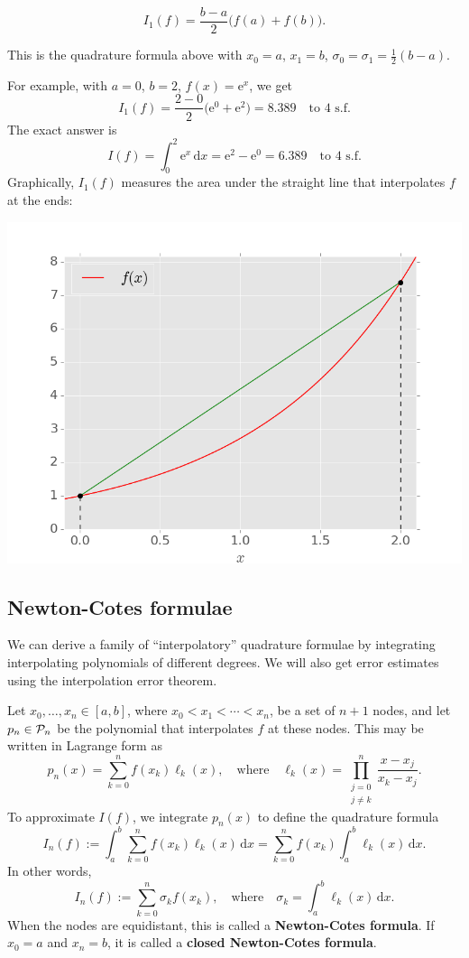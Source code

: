 \documentclass[
  letterpaper,
  DIV=11,
  numbers=noendperiod]{scrreprt}
\newenvironment{fbxSimple}[3]{\begin{tcolorbox}[enhanced, breakable,%
attach boxed title to top*={xshift=1.4pt},
boxed title style={boxrule=0.0mm, fuzzy shadow={1pt}{-1pt}{0mm}{0.1mm}{gray}, arc=.3em, rounded corners=east, sharp corners=west}, colframe=#1-color2, colbacktitle=#1-color1, colback = white, coltitle=black,  titlerule=0mm, toprule=0pt, bottomrule=.7pt, leftrule=.3em, rightrule=.7pt, outer arc=.3em,  	left=.5em, right=.5em, bottomtitle=1mm, toptitle=1mm,title=\textbf{#2}\hspace{0.5em}{#3}]}
{\end{tcolorbox}}
\begin{document}
\label{the-trapezium-rule}
\begin{fbxSimple}{eg}{Example 4.7: }{The trapezium rule}
\label{the-trapezium-rule}
\[
I_1(f) = \frac{b-a}{2}\Big( f(a) + f(b) \Big).
\]

This is the quadrature formula above with \(x_0=a\), \(x_1=b\),
\(\sigma_0=\sigma_1=\tfrac12(b-a)\).

For example, with \(a=0\), \(b=2\), \(f(x)=\mathrm{e}^x\), we get \[
I_1(f) = \frac{2 - 0}{2}\big(\mathrm{e}^0 + \mathrm{e}^{2}\big) = 8.389 \quad \textrm{to 4 s.f.}
\] The exact answer is \[
I(f) = \int_0^{2}\mathrm{e}^x\,\mathrm{d}x = \mathrm{e}^{2} - \mathrm{e}^0 = 6.389 \quad \textrm{to 4 s.f.}
\] Graphically, \(I_1(f)\) measures the area under the straight line
that interpolates \(f\) at the ends:

\begin{center}
\includegraphics[width=0.6\linewidth,height=\textheight,keepaspectratio]{im/trapz.png}
\end{center}

\end{fbxSimple}

\subsection{Newton-Cotes formulae}\label{newton-cotes-formulae}

We can derive a family of ``interpolatory'' quadrature formulae by
integrating interpolating polynomials of different degrees. We will also
get error estimates using the interpolation error theorem.

Let \(x_0, \ldots, x_n \in [a,b]\), where \(x_0 < x_1 < \cdots < x_n\),
be a set of \(n+1\) nodes, and let \(p_n\in{\cal P}_n\) be the
polynomial that interpolates \(f\) at these nodes. This may be written
in Lagrange form as \[
p_n(x) = \sum_{k=0}^n f(x_k)\ell_k(x), \quad \textrm{where}\quad \ell_k(x) = \prod_{\substack{j=0\\j\neq k}}^n\frac{x - x_j}{x_k - x_j}.
\] To approximate \(I(f)\), we integrate \(p_n(x)\) to define the
quadrature formula \[
I_n(f) := \int_a^b\sum_{k=0}^n f(x_k)\ell_k(x)\,\mathrm{d}x = \sum_{k=0}^n f(x_k)\int_a^b\ell_k(x)\,\mathrm{d}x.
\] In other words, \[
I_n(f) := \sum_{k=0}^n\sigma_k f(x_k), \quad \textrm{where} \quad \sigma_k = \int_a^b\ell_k(x)\,\mathrm{d}x.
\] When the nodes are equidistant, this is called a \textbf{Newton-Cotes
formula}. If \(x_0=a\) and \(x_n=b\), it is called a \textbf{closed
Newton-Cotes formula}.
\end{document}
